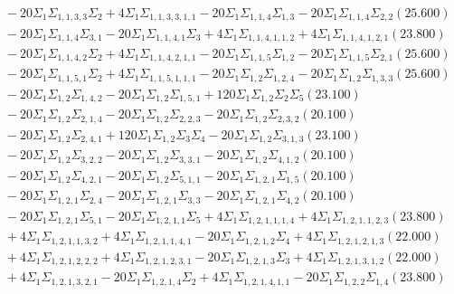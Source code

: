 \documentclass[12pt]{article}
\begin{document}
\begin{landscape}
\begin{align*}
		&\quad\quad -20\Sigma_{1}\Sigma_{1,1,3,3}\Sigma_{2}+4\Sigma_{1}\Sigma_{1,1,3,3,1,1}-20\Sigma_{1}\Sigma_{1,1,4}\Sigma_{1,3}-20\Sigma_{1}\Sigma_{1,1,4}\Sigma_{2,2}(25.600) \\ 
		&\quad\quad -20\Sigma_{1}\Sigma_{1,1,4}\Sigma_{3,1}-20\Sigma_{1}\Sigma_{1,1,4,1}\Sigma_{3}+4\Sigma_{1}\Sigma_{1,1,4,1,1,2}+4\Sigma_{1}\Sigma_{1,1,4,1,2,1}(23.800) \\ 
		&\quad\quad -20\Sigma_{1}\Sigma_{1,1,4,2}\Sigma_{2}+4\Sigma_{1}\Sigma_{1,1,4,2,1,1}-20\Sigma_{1}\Sigma_{1,1,5}\Sigma_{1,2}-20\Sigma_{1}\Sigma_{1,1,5}\Sigma_{2,1}(25.600) \\ 
		&\quad\quad -20\Sigma_{1}\Sigma_{1,1,5,1}\Sigma_{2}+4\Sigma_{1}\Sigma_{1,1,5,1,1,1}-20\Sigma_{1}\Sigma_{1,2}\Sigma_{1,2,4}-20\Sigma_{1}\Sigma_{1,2}\Sigma_{1,3,3}(25.600) \\ 
		&\quad\quad -20\Sigma_{1}\Sigma_{1,2}\Sigma_{1,4,2}-20\Sigma_{1}\Sigma_{1,2}\Sigma_{1,5,1}+120\Sigma_{1}\Sigma_{1,2}\Sigma_{2}\Sigma_{5}(23.100) \\ 
		&\quad\quad -20\Sigma_{1}\Sigma_{1,2}\Sigma_{2,1,4}-20\Sigma_{1}\Sigma_{1,2}\Sigma_{2,2,3}-20\Sigma_{1}\Sigma_{1,2}\Sigma_{2,3,2}(20.100) \\ 
		&\quad\quad -20\Sigma_{1}\Sigma_{1,2}\Sigma_{2,4,1}+120\Sigma_{1}\Sigma_{1,2}\Sigma_{3}\Sigma_{4}-20\Sigma_{1}\Sigma_{1,2}\Sigma_{3,1,3}(23.100) \\ 
		&\quad\quad -20\Sigma_{1}\Sigma_{1,2}\Sigma_{3,2,2}-20\Sigma_{1}\Sigma_{1,2}\Sigma_{3,3,1}-20\Sigma_{1}\Sigma_{1,2}\Sigma_{4,1,2}(20.100) \\ 
		&\quad\quad -20\Sigma_{1}\Sigma_{1,2}\Sigma_{4,2,1}-20\Sigma_{1}\Sigma_{1,2}\Sigma_{5,1,1}-20\Sigma_{1}\Sigma_{1,2,1}\Sigma_{1,5}(20.100) \\ 
		&\quad\quad -20\Sigma_{1}\Sigma_{1,2,1}\Sigma_{2,4}-20\Sigma_{1}\Sigma_{1,2,1}\Sigma_{3,3}-20\Sigma_{1}\Sigma_{1,2,1}\Sigma_{4,2}(20.100) \\ 
		&\quad\quad -20\Sigma_{1}\Sigma_{1,2,1}\Sigma_{5,1}-20\Sigma_{1}\Sigma_{1,2,1,1}\Sigma_{5}+4\Sigma_{1}\Sigma_{1,2,1,1,1,4}+4\Sigma_{1}\Sigma_{1,2,1,1,2,3}(23.800) \\ 
		&\quad\quad +4\Sigma_{1}\Sigma_{1,2,1,1,3,2}+4\Sigma_{1}\Sigma_{1,2,1,1,4,1}-20\Sigma_{1}\Sigma_{1,2,1,2}\Sigma_{4}+4\Sigma_{1}\Sigma_{1,2,1,2,1,3}(22.000) \\ 
		&\quad\quad +4\Sigma_{1}\Sigma_{1,2,1,2,2,2}+4\Sigma_{1}\Sigma_{1,2,1,2,3,1}-20\Sigma_{1}\Sigma_{1,2,1,3}\Sigma_{3}+4\Sigma_{1}\Sigma_{1,2,1,3,1,2}(22.000) \\ 
		&\quad\quad +4\Sigma_{1}\Sigma_{1,2,1,3,2,1}-20\Sigma_{1}\Sigma_{1,2,1,4}\Sigma_{2}+4\Sigma_{1}\Sigma_{1,2,1,4,1,1}-20\Sigma_{1}\Sigma_{1,2,2}\Sigma_{1,4}(23.800) \\ 

\end{align*}
\end{landscape}
\end{document}
